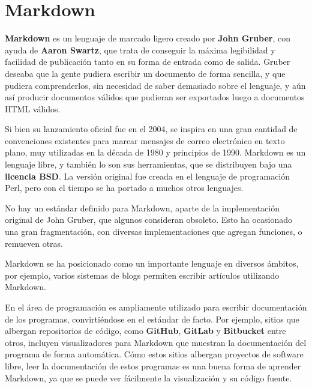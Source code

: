 
\chapter{Markdown}
\label{anex:markdown}

\textbf{Markdown} es un lenguaje de marcado ligero creado por \textbf{John Gruber},
con ayuda de \textbf{Aaron Swartz}, que trata de conseguir la máxima legibilidad
y facilidad de publicación tanto en su forma de entrada como de salida. Gruber
deseaba que la gente pudiera escribir un documento de forma sencilla, y que
pudiera comprenderlos, sin necesidad de saber demasiado sobre el lenguaje, y
aún así producir documentos válidos que pudieran ser exportados luego a documentos
HTML válidos.

Si bien su lanzamiento oficial fue en el 2004, se inspira en una gran cantidad
de convenciones existentes para marcar mensajes de correo electrónico en texto
plano, muy utilizadas en la década de 1980 y principios de 1990. Markdown es un
lenguaje libre, y también lo son sus herramientas, que se distribuyen bajo una
\textbf{licencia BSD}. La versión original fue creada en el lenguaje de
programación Perl, pero con el tiempo se ha portado a muchos otros lenguajes.

No hay un estándar definido para Markdown, aparte de la implementación original
de John Gruber, que algunos consideran obsoleto. Esto ha ocasionado una gran
fragmentación, con diversas implementaciones que agregan funciones, o remueven
otras.

Markdown se ha posicionado como un importante lenguaje en diversos ámbitos, por
ejemplo, varios sistemas de blogs permiten escribir artículos utilizando
Markdown.

En el área de programación es ampliamente utilizado para escribir documentación
de los programas, convirtiéndose en el estándar de facto. Por ejemplo,
sitios que albergan repositorios de código, como \textbf{GitHub}, \textbf{GitLab}
y \textbf{Bitbucket} entre otros, incluyen visualizadores para Markdown que
muestran la documentación del programa de forma automática. Cómo estos sitios
albergan proyectos de software libre, leer la documentación de estos programas
es una buena forma de aprender Markdown, ya que se puede ver fácilmente la
visualización y su código fuente.

